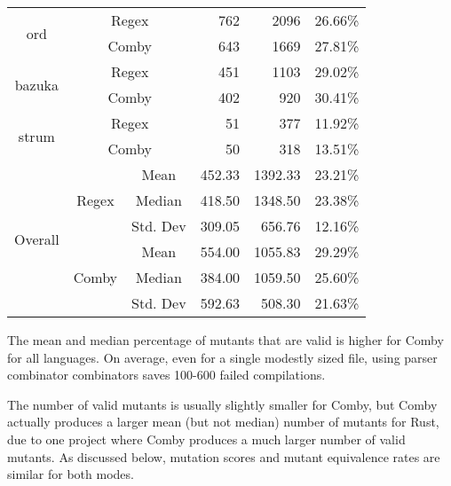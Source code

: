 \documentclass[sigconf,review, anonymous]{acmart}
\begin{document}
{\begin{table}[hbtp]
{\begin{tabular}{|c|c|c|r|r|r|}
\multirow{2}{*}{ord} & \multicolumn{2}{c|}{Regex} & 762 \hspace{8pt}	& 2096 \hspace{8pt} & 26.66\% \\\cline{2-6}
    & \multicolumn{2}{c|}{Comby} & 643 \hspace{8pt} & 1669 \hspace{8pt} & 27.81\% \\ \hline
\multirow{2}{*}{bazuka} & \multicolumn{2}{c|}{Regex} & 451 \hspace{8pt} & 1103 \hspace{8pt} & 29.02\% \\\cline{2-6}
    & \multicolumn{2}{c|}{Comby} & 402 \hspace{8pt} & 920 \hspace{8pt} & 30.41\% \\ \hline
\multirow{2}{*}{strum} & \multicolumn{2}{c|}{Regex} & 51 \hspace{8pt} & 377 \hspace{8pt}	& 11.92\% \\\cline{2-6}
    & \multicolumn{2}{c|}{Comby} & 50 \hspace{8pt} & 318 \hspace{8pt}	& 13.51\% \\ \hline

\multirow{6}{*}{Overall} & \multirow{3}{*}{Regex} & Mean & 452.33 & 1392.33	& 23.21\%\\\cline{3-6}
    &   &  Median & 418.50 & 1348.50 & 23.38\%  \\\cline{3-6}
    &   &  Std. Dev & 309.05 & 656.76 & 12.16\%  \\\cline{2-6}

 & \multirow{3}{*}{Comby} & Mean & 554.00 & 1055.83	& 29.29\% \\\cline{3-6}
    &   &  Median & 384.00 & 1059.50	& 25.60\%  \\\cline{3-6}
    &   &  Std. Dev & 592.63 & 508.30 & 21.63\%  \\\hline


\end{tabular}

}
\end{table}

The mean and median percentage of mutants that are valid is higher for
Comby for all languages.  On average, even for a single modestly sized
file, using parser combinator combinators saves 100-600 failed
compilations.

The number of valid mutants is usually
slightly smaller for Comby, but Comby actually produces a larger mean
(but not median) number of mutants for Rust, due to one project where
Comby produces a much larger number of valid mutants.  As discussed 
below, mutation scores and mutant equivalence rates are similar for
both modes.

}
\end{document}
